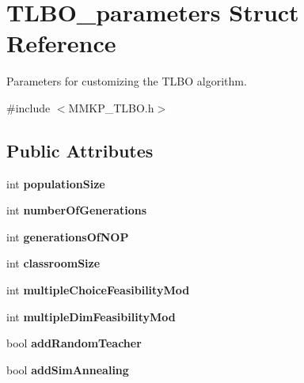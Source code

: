 \hypertarget{struct_t_l_b_o__parameters}{\section{T\+L\+B\+O\+\_\+parameters Struct Reference}
\label{struct_t_l_b_o__parameters}
}


Parameters for customizing the T\+L\+B\+O algorithm.  




{\ttfamily \#include $<$M\+M\+K\+P\+\_\+\+T\+L\+B\+O.\+h$>$}

\subsection*{Public Attributes}
\begin{DoxyCompactItemize}
\item 
\hypertarget{struct_t_l_b_o__parameters_a85bb3efd9c225a720c243502388800a4}{int {\bfseries population\+Size}}\label{struct_t_l_b_o__parameters_a85bb3efd9c225a720c243502388800a4}

\item 
\hypertarget{struct_t_l_b_o__parameters_a2e65a62e1f51bbc5a5129cce67eb3c42}{int {\bfseries number\+Of\+Generations}}\label{struct_t_l_b_o__parameters_a2e65a62e1f51bbc5a5129cce67eb3c42}

\item 
\hypertarget{struct_t_l_b_o__parameters_a13cf7c6d4bd63924455180f2fc5708c3}{int {\bfseries generations\+Of\+N\+O\+P}}\label{struct_t_l_b_o__parameters_a13cf7c6d4bd63924455180f2fc5708c3}

\item 
\hypertarget{struct_t_l_b_o__parameters_a8dec005b886d2fc21eee7058d13005b5}{int {\bfseries classroom\+Size}}\label{struct_t_l_b_o__parameters_a8dec005b886d2fc21eee7058d13005b5}

\item 
\hypertarget{struct_t_l_b_o__parameters_a62d47e766b5a0431fbdcabcee7816751}{int {\bfseries multiple\+Choice\+Feasibility\+Mod}}\label{struct_t_l_b_o__parameters_a62d47e766b5a0431fbdcabcee7816751}

\item 
\hypertarget{struct_t_l_b_o__parameters_a602bb8be8c4f17ec7d70af33c9be36be}{int {\bfseries multiple\+Dim\+Feasibility\+Mod}}\label{struct_t_l_b_o__parameters_a602bb8be8c4f17ec7d70af33c9be36be}

\item 
\hypertarget{struct_t_l_b_o__parameters_ab4dead72475e9a945b2bed9358152e25}{bool {\bfseries add\+Random\+Teacher}}\label{struct_t_l_b_o__parameters_ab4dead72475e9a945b2bed9358152e25}

\item 
\hypertarget{struct_t_l_b_o__parameters_ac4a740ceafcea10ba072738868e4d297}{bool {\bfseries add\+Sim\+Annealing}}\label{struct_t_l_b_o__parameters_ac4a740ceafcea10ba072738868e4d297}

\end{DoxyCompactItemize}


